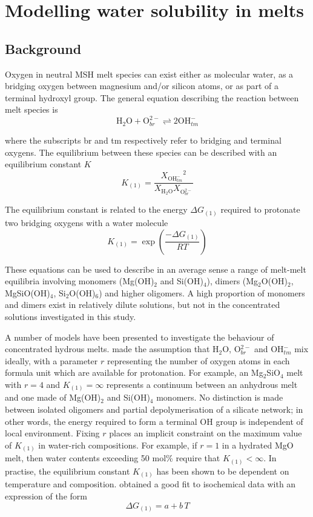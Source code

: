 \documentclass[review]{elsarticle}
\begin{document}
\section{Modelling water solubility in melts}
\subsection{Background}
Oxygen in neutral MSH melt species can exist either as molecular water, as a bridging oxygen between magnesium and/or silicon atoms, or as part of a terminal hydroxyl group. The general equation describing the reaction between melt species is
\begin{equation}
\textrm{H}_2\textrm{O} + \textrm{O}_{br}^{2-} \rightleftharpoons 2 \textrm{OH}_{tm}^-
\label{eqn:speciation}
\end{equation}

where the subscripts br and tm respectively refer to bridging and terminal oxygens. The equilibrium between these species can be described with an equilibrium constant $K$ \cite[e.g.][]{Stolper1982}
\begin{equation}
K_{(1)} = \frac{{X_{\textrm{OH}_{tm}^-}}^2}{X_{\textrm{H}_2\textrm{O}} X_{\textrm{O}_{br}^{2-}} }
\label{eqn:equilibrium_constant}
\end{equation}

The equilibrium constant is related to the energy $\Delta G_{(1)}$ required to protonate two bridging oxygens with a water molecule
\begin{equation}
K_{(1)} = \exp\left(\frac{-\Delta G_{(1)}}{RT}\right)
\end{equation}

These equations can be used to describe in an average sense a range of melt-melt equilibria involving monomers (Mg(OH)$_2$ and Si(OH)$_4$), dimers (Mg$_2$O(OH)$_2$, MgSiO(OH)$_4$, Si$_2$O(OH)$_6$) and higher oligomers. A high proportion of monomers and dimers exist in relatively dilute solutions, but not in the concentrated solutions investigated in this study.

A number of models have been presented to investigate the behaviour of concentrated hydrous melts. \cite{SS1985} made the assumption that H$_2$O, O$_{br}^{2-}$ and OH$_{tm}^-$ mix ideally, with a parameter $r$ representing the number of oxygen atoms in each formula unit which are available for protonation. For example, an Mg$_2$SiO$_4$ melt with $r=4$ and $K_{(1)}=\infty$ represents a continuum between an anhydrous melt and one made of Mg(OH)$_2$ and Si(OH)$_4$ monomers. No distinction is made between isolated oligomers and partial depolymerisation of a silicate network; in other words, the energy required to form a terminal OH group is independent of local environment. Fixing $r$ places an implicit constraint on the maximum value of $K_{(1)}$ in water-rich compositions. For example, if $r=1$ in a hydrated MgO melt, then water contents exceeding 50 mol\% require that $K_{(1)}<\infty$. In practise, the equilibrium constant $K_{(1)}$ has been shown to be dependent on temperature and composition. \cite{SK1995} obtained a good fit to isochemical data with an expression of the form
\begin{equation}
\Delta G_{(1)} = a + b\,T
\end{equation}
\end{document}
